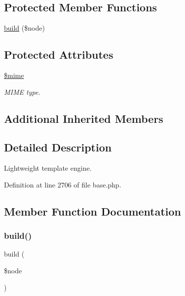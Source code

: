 \subsection*{Protected Member Functions}
\begin{DoxyCompactItemize}
\item 
\hyperlink{class_preview_a0e9d773ad8306b0d66337606414a443d}{build} (\$node)
\end{DoxyCompactItemize}
\subsection*{Protected Attributes}
\begin{DoxyCompactItemize}
\item 
\hypertarget{class_preview_a958cf7aca45cea5359ba0fa80ee2f2c1}{}\label{class_preview_a958cf7aca45cea5359ba0fa80ee2f2c1} 
\hyperlink{class_preview_a958cf7aca45cea5359ba0fa80ee2f2c1}{\$mime}
\begin{DoxyCompactList}\small\item\em M\+I\+ME type. \end{DoxyCompactList}\end{DoxyCompactItemize}
\subsection*{Additional Inherited Members}


\subsection{Detailed Description}
Lightweight template engine. 

Definition at line 2706 of file base.\+php.



\subsection{Member Function Documentation}
\hypertarget{class_preview_a0e9d773ad8306b0d66337606414a443d}{}\label{class_preview_a0e9d773ad8306b0d66337606414a443d} 
\subsubsection{\texorpdfstring{build()}{build()}}
{\footnotesize\ttfamily build (\begin{DoxyParamCaption}\item[{}]{\$node }\end{DoxyParamCaption})\hspace{0.3cm}{\ttfamily [protected]}}

